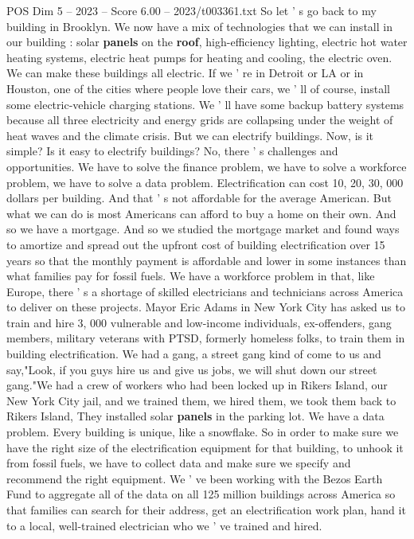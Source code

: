 \begin{textsample}{POS Dim 5 – 2023 – Score 6.00 – 2023/t003361.txt}
So let ' s go back to my building in Brooklyn.
We now have a mix of technologies that we can install in our building : solar \textbf{panels} on the \textbf{roof}, high-efficiency lighting, electric hot water heating systems, electric heat pumps for heating and cooling, the electric oven.
We can make these buildings all electric.
If we ' re in Detroit or LA or in Houston, one of the cities where people love their cars, we ' ll of course, install some electric-vehicle charging stations.
We ' ll have some backup battery systems because all three electricity and energy grids are collapsing under the weight of heat waves and the climate crisis.
But we can electrify buildings.
Now, is it simple?
Is it easy to electrify buildings?
No, there ' s challenges and opportunities.
We have to solve the finance problem, we have to solve a workforce problem, we have to solve a data problem.
Electrification can cost 10, 20, 30, 000 dollars per building.
And that ' s not affordable for the average American.
But what we can do is most Americans can afford to buy a home on their own.
And so we have a mortgage.
And so we studied the mortgage market and found ways to amortize and spread out the upfront cost of building electrification over 15 years so that the monthly payment is affordable and lower in some instances than what families pay for fossil fuels.
We have a workforce problem in that, like Europe, there ' s a shortage of skilled electricians and technicians across America to deliver on these projects.
Mayor Eric Adams in New York City has asked us to train and hire 3, 000 vulnerable and low-income individuals, ex-offenders, gang members, military veterans with PTSD, formerly homeless folks, to train them in building electrification.
We had a gang, a street gang kind of come to us and say,"Look, if you guys hire us and give us jobs, we will shut down our street gang."We had a crew of workers who had been locked up in Rikers Island, our New York City jail, and we trained them, we hired them, we took them back to Rikers Island, They installed solar \textbf{panels} in the parking lot.
We have a data problem.
Every building is unique, like a snowflake.
So in order to make sure we have the right size of the electrification equipment for that building, to unhook it from fossil fuels, we have to collect data and make sure we specify and recommend the right equipment.
We ' ve been working with the Bezos Earth Fund to aggregate all of the data on all 125 million buildings across America so that families can search for their address, get an electrification work plan, hand it to a local, well-trained electrician who we ' ve trained and hired.

\end{textsample}
